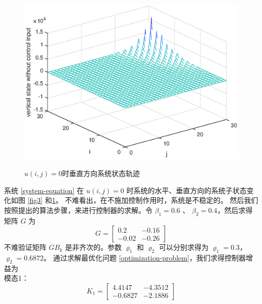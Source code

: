 	\begin{figure}[!htb]
		\centering\includegraphics[scale=0.6]{./figures/2dsmc/simulations/vx-no-controll-input.eps}\\ 
		\caption{ $u(i,j)=0$时垂直方向系统状态轨迹}
		\label{fig4}
	\end{figure}
	系统 \eqref{system-equation} 在 $u(i,j) = 0$ 时系统的水平、垂直方向的系统子状态变化如图  \ref{fig3} 和\ref{fig4}。 不难看出，在不施加控制作用时，系统是不稳定的。
	然后我们按照提出的算法步骤，来进行控制器的求解。令 $\beta_{1}=0.6$ 、 $\beta_{2}=0.4$，然后求得矩阵 $G$ 为
	\begin{equation*}
	G=\begin{bmatrix}
	0.2&-0.16\\
	-0.02&-0.26
	\end{bmatrix}
	\end{equation*}
	不难验证矩阵 $GB_{k}$ 是非齐次的。参数 $\varrho_{1}$ 和 $\varrho_{2}$ 可以分别求得为 $\varrho_{1}=0.3$， $\varrho_{2}=0.6872$。 通过求解最优化问题 \eqref{optimization-problem}，我们求得控制器增益为\\
	
	模态1：
	\begin{equation*}
	K_{1}=\begin{bmatrix}
	4.4147  & -4.3512\\
	-0.6827 &  -2.1886
	\end{bmatrix}
	\end{equation*}
	
